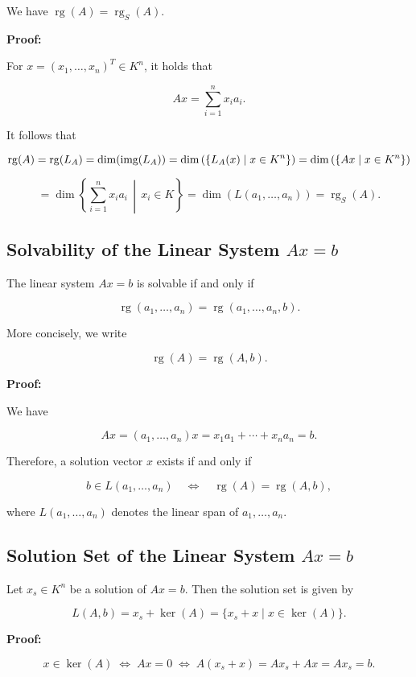 We have \(\operatorname{rg}(A) = \operatorname{rg}_S(A)\).

\textbf{Proof:} 

For \(x = {(x_1, \ldots, x_n)}^T \in K^n\), it holds that

\[
	Ax = \sum_{i=1}^{n} x_i a_i.
\]

It follows that

\[
	\operatorname{rg}(A) = \operatorname{rg}(L_A) = \dim(\text{img}(L_A))
	= \dim\left(\{L_A(x) \mid x \in K^n\}\right)
	= \dim\left(\{Ax \mid x \in K^n\}\right)
\]

\[
	= \dim\left\{ \sum_{i=1}^{n} x_i a_i \,\middle|\, x_i \in K \right\}
	= \dim(L(a_1, \ldots, a_n)) = \operatorname{rg}_S(A).
\]

\subsection{Solvability of the Linear System \texorpdfstring{\(Ax = b\)}{}}

The linear system \(Ax = b\) is solvable if and only if

\[
	\operatorname{rg}(a_1, \ldots, a_n) = \operatorname{rg}(a_1, \ldots, a_n, b).
\]

More concisely, we write

\[
	\operatorname{rg}(A) = \operatorname{rg}(A, b).
\]

\textbf{Proof:} 

We have

\[
	Ax = (a_1, \ldots, a_n)x = x_1 a_1 + \cdots + x_n a_n = b.
\]

Therefore, a solution vector \(x\) exists if and only if

\[
	b \in L(a_1, \ldots, a_n) \quad \Leftrightarrow \quad \operatorname{rg}(A) = \operatorname{rg}(A, b),
\]

where \(L(a_1, \ldots, a_n)\) denotes the linear span of \(a_1, \ldots, a_n\).

\subsection{Solution Set of the Linear System \texorpdfstring{\(Ax = b\)}{}}

Let \(x_s \in K^n\) be a solution of \(Ax = b\). Then the solution set is given by

\[
	L(A, b) = x_s + \ker(A) = \{x_s + x \mid x \in \ker(A)\}.
\]

\textbf{Proof:}

\[
	x \in \ker(A) \;\Leftrightarrow\; Ax = 0 \;\Leftrightarrow\; A(x_s + x) = Ax_s + Ax = Ax_s = b.
\]

